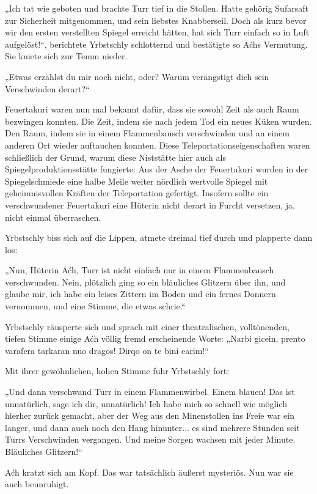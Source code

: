 „Ich tat wie geboten und brachte Turr tief in die Stollen. Hatte gehörig Sufarsaft zur Sicherheit mitgenommen, und sein liebstes Knabberseil. Doch als kurz bevor wir den ersten verstellten Spiegel erreicht hätten, hat sich Turr einfach so in Luft aufgelöst!“, berichtete Yrbstschly schlotternd und bestätigte so Aćhs Vermutung. Sie kniete sich zur Temm nieder.

„Etwas erzählst du mir noch nicht, oder? Warum verängstigt dich sein Verschwinden derart?“

Feuertakuri waren nun mal bekannt dafür, dass sie sowohl Zeit als auch Raum bezwingen konnten. Die Zeit, indem sie nach jedem Tod ein neues Küken wurden. Den Raum, indem sie in einem Flammenbausch verschwinden und an einem anderen Ort wieder auftauchen konnten. Diese Teleportationseigenschaften waren schließlich der Grund, warum diese Niststätte hier auch als Spiegelproduktionsstätte fungierte: Aus der Asche der Feuertakuri wurden in der Spiegelschmiede eine halbe Meile weiter nördlich wertvolle Spiegel mit geheimnisvollen Kräften der Teleportation gefertigt. Insofern sollte ein verschwundener Feuertakuri eine Hüterin nicht derart in Furcht versetzen, ja, nicht einmal überraschen.

Yrbstschly biss sich auf die Lippen, atmete dreimal tief durch und plapperte dann los:

„Nun, Hüterin Aćh, Turr ist nicht einfach nur in einem Flammenbausch verschwunden. Nein, plötzlich ging so ein bläuliches Glitzern über ihn, und glaube mir, ich habe ein leises Zittern im Boden und ein fernes Donnern vernommen, und eine Stimme, die etwas schrie.“

Yrbstschly räusperte sich und sprach mit einer theatralischen, volltönenden, tiefen Stimme einige Aćh völlig fremd erscheinende Worte: „Narbi gicein, prento varafera tarkaran nuo dragos! Dirqo on te bini earim!“

Mit ihrer gewöhnlichen, hohen Stimme fuhr Yrbstschly fort:

„Und dann verschwand Turr in einem Flammenwirbel. Einem blauen! Das ist unnatürlich, sage ich dir, unnatürlich! Ich habe mich so schnell wie möglich hierher zurück gemacht, aber der Weg aus den Minenstollen ins Freie war ein langer, und dann auch noch den Hang hinunter... es sind mehrere Stunden seit Turrs Verschwinden vergangen. Und meine Sorgen wachsen mit jeder Minute. Bläuliches Glitzern!“

Aćh kratzt sich am Kopf. Das war tatsächlich äußerst mysteriös. Nun war sie auch beunruhigt.

